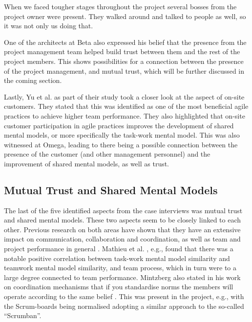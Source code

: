 \begin{fancyquotes}
When we faced tougher stages throughout the project several bosses from the project owner were present. They walked around and talked to people as well, so it was not only us doing that.
\end{fancyquotes}

One of the architects at Beta also expressed his belief that the presence from the project management team helped build trust between them and the rest of the project members. This shows possibilities for a connection between the presence of the project management, and mutual trust, which will be further discussed in the coming section.

Lastly, Yu et al. \cite{Yu2014} as part of their study took a closer look at the aspect of on-site customers. They stated that this was identified as one of the most beneficial agile practices to achieve higher team performance. They also highlighted that on-site customer participation in agile practices improves the development of shared mental models, or more specifically the task-work mental model. This was also witnessed at Omega, leading to there being a possible connection between the presence of the customer (and other management personnel) and the improvement of shared mental models, as well as trust.

\subsection{Mutual Trust and Shared Mental Models}
\label{mtasmm}

The last of the five identified aspects from the case interviews was mutual trust and shared mental models. These two aspects seem to be closely linked to each other. Previous research on both areas have shown that they have an extensive impact on communication, collaboration and coordination, as well as team and project performance in general \cite{Bandow2001, Salas2005, cooper1998executive, Mathieu2000}. Mathieu et al. \cite{Mathieu2000}, e.g., found that there was a notable positive correlation between task-work mental model similarity and teamwork mental model similarity, and team process, which in turn were to a large degree connected to team performance. Mintzberg also stated in his work on coordination mechanisms that if you standardise norms the members will operate according to the same belief \cite{mintzberg1989mintzberg}. This was present in the project, e.g., with the Scrum-boards being normalised adopting a similar approach to the so-called ``Scrumban''. 

